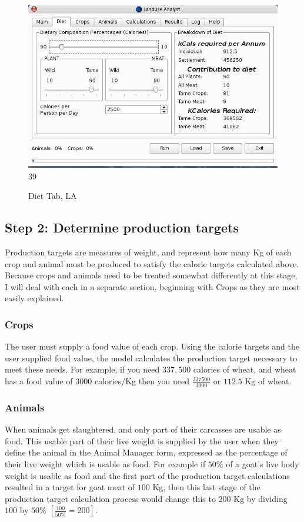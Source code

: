 \begin{figure}[htbp]
  \label{fig:LADiet}%
    \includegraphics[scale=.355]{./images/LanduseAnalystDiet545.jpg}
39
  \caption{ Diet Tab, LA}
\end{figure}

\subsection{Step 2: Determine production targets}
  Production targets are measures of weight, and represent how many Kg of each
  crop and animal must be produced to satisfy the calorie targets calculated
  above.  Because crops and animals need to be treated somewhat differently at
  this stage, I will deal with each in a separate section, beginning with Crops
  as they are most easily explained.

  \subsubsection{Crops}
The user must supply a food value of each crop.  Using the calorie targets and
the user supplied food value, the model calculates the production target
necessary to meet these needs.  For example, if you need $337,500$ calories of
wheat, and wheat has a food value of $3000$ calories/Kg then you need
$\frac{337500}{3000}$ or $112.5$ Kg of wheat.

  \subsubsection{Animals}
When animals get slaughtered, and only part of their carcasses are usable as
food.  This usable part of their live weight is supplied by the user when they
define the animal in the Animal Manager form, expressed as the percentage of
their live weight which is usable as food. For example if $50\%$ of a goat's
live body weight is usable as food and the first part of the production target
calculations resulted in a target for goat meat of $100$ Kg, then this last
stage of the production target calculation process would change this to $200$
Kg by dividing $100$ by $50\%$   $\left[ \frac{100}{50\%}=200\right]$.

